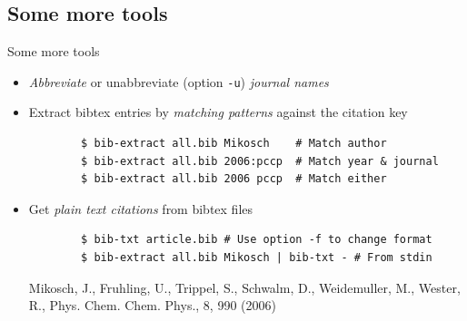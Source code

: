 \documentclass[xcolor={table,dvipsnames}]{beamer}
\renewcommand{\emph}[1]{\textit{\color{orange!90!brown}#1}}
\newcommand{\faint}{\color{black!10!gray}}
\newcommand{\bashcmd}[2][-0.6\baselineskip]{%
  \vspace{#1}%
}
\newcommand{\bashout}[2][-0.1\baselineskip]{%
  \vspace{#1}%
}
\begin{document}
\subsection{Some more tools}
\begin{frame}[fragile]{Some more tools}
  \begin{itemize}

    \item \emph{Abbreviate} or unabbreviate
      (option {\faint\verb!-u!}) \emph{journal names}
      \bashcmd{cmdline/jabbr/jabbr-1-in.txt}
      \bashout{cmdline/jabbr/jabbr-1-out.txt}

    \item Extract bibtex entries by \emph{matching patterns} against the citation key
      \begin{lstlisting}
        $ bib-extract all.bib Mikosch    # Match author
        $ bib-extract all.bib 2006:pccp  # Match year & journal
        $ bib-extract all.bib 2006 pccp  # Match either
      \end{lstlisting}

    \item Get \emph{plain text citations} from bibtex files
      \begin{lstlisting}
        $ bib-txt article.bib # Use option -f to change format
        $ bib-extract all.bib Mikosch | bib-txt - # From stdin
      \end{lstlisting}
      {\faint\footnotesize Mikosch, J., Fruhling, U., Trippel, S., Schwalm, D.,
        Weidemuller, M., Wester, R., Phys. Chem. Chem. Phys., 8, 990 (2006) }

  \end{itemize}
\end{frame}
\end{document}
